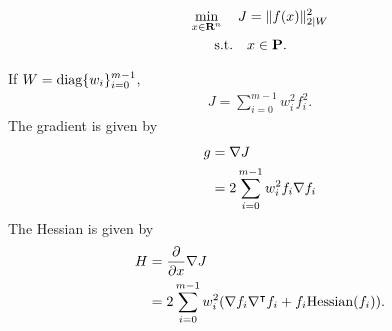 \documentclass{article}
\begin{document}
    \begin{align}
        \min_{x\in\textbf{R}^n}\quad J &= \|f(x)\|_{2|W}^2\\
        \text{s.t.} \quad &x\in\textbf{P}.\nonumber
    \end{align}

    If $W=\text{diag}\{w_i\}_{i=0}^{m-1}$,
    \begin{align*}
        J = \sum_{i=0}^{m-1} w_i^2 f_i^2.
    \end{align*}
    The gradient is given by
    \begin{align*}
        g&=\nabla J \\
        & = 2\sum_{i=0}^{m-1}  w_i^2 f_i \nabla f_i
    \end{align*}
    The Hessian is given by
    \begin{align*}
        H&=\frac{\partial }{\partial x}\nabla J \\
        &= 2\sum_{i=0}^{m-1}  w_i^2 (\nabla f_i \nabla^\intercal f_i+f_i \text{Hessian}(f_i)).
    \end{align*}
\end{document}
